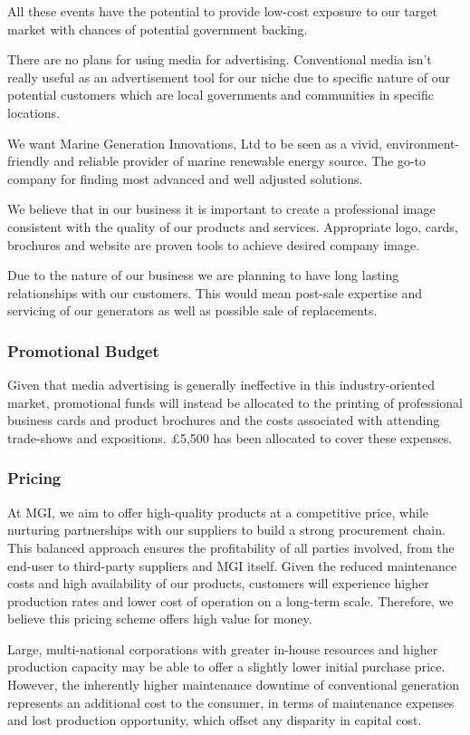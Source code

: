 \documentclass[a4paper,11pt]{article}
\begin{document}
All these events have the potential to provide low-cost exposure to our target market with chances of potential government backing.

There are no plans for using media for advertising. Conventional media isn't really useful as an advertisement tool for our niche due to specific nature of our potential customers which are local governments and communities in specific locations.

We want Marine Generation Innovations, Ltd to be seen as a vivid, environment-friendly and reliable provider of marine renewable energy source. The go-to company for finding most advanced and well adjusted solutions.

We believe that in our business it is important to create a professional image consistent with the quality of our products and services. Appropriate logo, cards, brochures and website are proven tools to achieve desired company image.

Due to the nature of our business we are planning to have long lasting relationships with our customers. This would mean post-sale expertise and servicing of our generators as well as possible sale of replacements.

\subsubsection{Promotional Budget}
Given that media advertising is generally ineffective in this industry-oriented market, promotional funds will instead be allocated to the printing of professional business cards and product brochures and the costs associated with attending trade-shows and expositions. £5,500 has been allocated to cover these expenses.

\subsubsection{Pricing}
At MGI, we aim to offer high-quality products at a competitive price, while nurturing partnerships with our suppliers to build a strong procurement chain. This balanced approach ensures the profitability of all parties involved, from the end-user to third-party suppliers and MGI itself. Given the reduced maintenance costs and high availability of our products, customers will experience higher production rates and lower cost of operation on a long-term scale. Therefore, we believe this pricing scheme offers high value for money.

Large, multi-national corporations with greater in-house resources and higher production capacity may be able to offer a slightly lower initial purchase price. However, the inherently higher maintenance downtime of conventional generation represents an additional cost to the consumer, in terms of maintenance expenses and lost production opportunity, which offset any disparity in capital cost.
\end{document}
